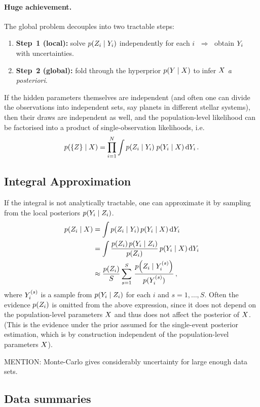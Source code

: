 \documentclass[12pt,a4paper]{article}
\begin{document}
\paragraph{Huge achievement.}
The global problem decouples into two tractable steps:
\begin{enumerate}
  \item \textbf{Step~1 (local):} solve $p(Z_i\mid Y_{i})$ independently
        for each $i$ $\;\Rightarrow\;$ obtain $Y_{i}$ with uncertainties.
  \item \textbf{Step~2 (global):} fold through the hyperprior
        $p(Y\mid X)$ to infer $X$ \emph{a posteriori}.
\end{enumerate}
If the hidden parameters themselves are independent (and often one can divide the observations into independent sets, say planets in different stellar systems), then their draws are independent as well, and the population-level likelihood can be factorised into a product of single-observation likelihoods, i.e.
\[
    p(\{Z\}\mid X) = \prod_{i=1}^{N} \int p(Z_i\mid Y_{i}) \; p(Y_{i}\mid X) \, \mathrm{d} Y_{i}
    \,.
\]


\subsection{Integral Approximation}
If the integral is not analytically tractable, one can approximate it by sampling from the local posteriors $p(Y_{i} \mid Z_i)$.
\begin{align}
    p\!\left(Z_i\mid X\right) 
    &=
    \int p\!\left(Z_i\mid Y_{i}\right) p(Y_{i}\mid X) \, \mathrm{d} Y_{i}
    \nonumber \\
    &=
    \int \frac{p(Z_i) \,p\!\left(Y_{i}\mid Z_i\right) }{p(Z_i)} \,p(Y_{i}\mid X) \, \mathrm{d} Y_{i}
    \nonumber \\
    &\approx \frac{p(Z_i)}{S} \sum_{s=1}^{S} \,\frac{p\!\left(Z_i\mid Y_{i}^{(s)}\right)}{p(Y_{i}^{(s)})}
    \,,
\end{align}
%
where $Y_{i}^{(s)}$ is a sample from $p(Y_{i}\mid Z_i)$ for each $i$ and $s = 1,\dots,S$.
Often the evidence $p(Z_i)$ is omitted from the above expression, since it does not depend on the population-level parameters $X$ and thus does not affect the posterior of $X$. (This is the evidence under the prior assumed for the single-event posterior estimation, which is by construction independent of the population-level parameters $X$).

MENTION: Monte-Carlo gives considerably uncertainty for large enough data sets. 

\subsection{Data summaries}
\end{document}

